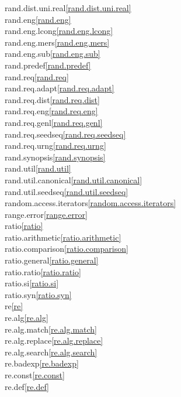 \begin{multicols}{2}
rand.dist.uni.real\quad\ref{rand.dist.uni.real}\\
rand.eng\quad\ref{rand.eng}\\
rand.eng.lcong\quad\ref{rand.eng.lcong}\\
rand.eng.mers\quad\ref{rand.eng.mers}\\
rand.eng.sub\quad\ref{rand.eng.sub}\\
rand.predef\quad\ref{rand.predef}\\
rand.req\quad\ref{rand.req}\\
rand.req.adapt\quad\ref{rand.req.adapt}\\
rand.req.dist\quad\ref{rand.req.dist}\\
rand.req.eng\quad\ref{rand.req.eng}\\
rand.req.genl\quad\ref{rand.req.genl}\\
rand.req.seedseq\quad\ref{rand.req.seedseq}\\
rand.req.urng\quad\ref{rand.req.urng}\\
rand.synopsis\quad\ref{rand.synopsis}\\
rand.util\quad\ref{rand.util}\\
rand.util.canonical\quad\ref{rand.util.canonical}\\
rand.util.seedseq\quad\ref{rand.util.seedseq}\\
random.access.iterators\quad\ref{random.access.iterators}\\
range.error\quad\ref{range.error}\\
ratio\quad\ref{ratio}\\
ratio.arithmetic\quad\ref{ratio.arithmetic}\\
ratio.comparison\quad\ref{ratio.comparison}\\
ratio.general\quad\ref{ratio.general}\\
ratio.ratio\quad\ref{ratio.ratio}\\
ratio.si\quad\ref{ratio.si}\\
ratio.syn\quad\ref{ratio.syn}\\
re\quad\ref{re}\\
re.alg\quad\ref{re.alg}\\
re.alg.match\quad\ref{re.alg.match}\\
re.alg.replace\quad\ref{re.alg.replace}\\
re.alg.search\quad\ref{re.alg.search}\\
re.badexp\quad\ref{re.badexp}\\
re.const\quad\ref{re.const}\\
re.def\quad\ref{re.def}\\

\end{multicols}
